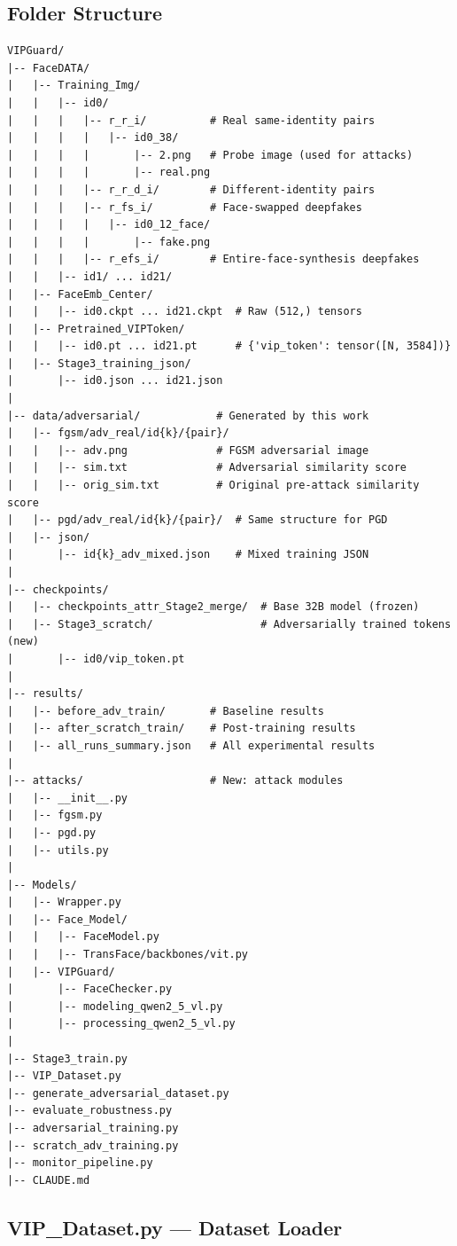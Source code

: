 \documentclass[12pt,a4paper]{article}
\begin{document}
\subsection{Folder Structure}

\begin{lstlisting}[language={},caption={Repository directory structure}]
VIPGuard/
|-- FaceDATA/
|   |-- Training_Img/
|   |   |-- id0/
|   |   |   |-- r_r_i/          # Real same-identity pairs
|   |   |   |   |-- id0_38/
|   |   |   |       |-- 2.png   # Probe image (used for attacks)
|   |   |   |       |-- real.png
|   |   |   |-- r_r_d_i/        # Different-identity pairs
|   |   |   |-- r_fs_i/         # Face-swapped deepfakes
|   |   |   |   |-- id0_12_face/
|   |   |   |       |-- fake.png
|   |   |   |-- r_efs_i/        # Entire-face-synthesis deepfakes
|   |   |-- id1/ ... id21/
|   |-- FaceEmb_Center/
|   |   |-- id0.ckpt ... id21.ckpt  # Raw (512,) tensors
|   |-- Pretrained_VIPToken/
|   |   |-- id0.pt ... id21.pt      # {'vip_token': tensor([N, 3584])}
|   |-- Stage3_training_json/
|       |-- id0.json ... id21.json
|
|-- data/adversarial/            # Generated by this work
|   |-- fgsm/adv_real/id{k}/{pair}/
|   |   |-- adv.png              # FGSM adversarial image
|   |   |-- sim.txt              # Adversarial similarity score
|   |   |-- orig_sim.txt         # Original pre-attack similarity score
|   |-- pgd/adv_real/id{k}/{pair}/  # Same structure for PGD
|   |-- json/
|       |-- id{k}_adv_mixed.json    # Mixed training JSON
|
|-- checkpoints/
|   |-- checkpoints_attr_Stage2_merge/  # Base 32B model (frozen)
|   |-- Stage3_scratch/                 # Adversarially trained tokens (new)
|       |-- id0/vip_token.pt
|
|-- results/
|   |-- before_adv_train/       # Baseline results
|   |-- after_scratch_train/    # Post-training results
|   |-- all_runs_summary.json   # All experimental results
|
|-- attacks/                    # New: attack modules
|   |-- __init__.py
|   |-- fgsm.py
|   |-- pgd.py
|   |-- utils.py
|
|-- Models/
|   |-- Wrapper.py
|   |-- Face_Model/
|   |   |-- FaceModel.py
|   |   |-- TransFace/backbones/vit.py
|   |-- VIPGuard/
|       |-- FaceChecker.py
|       |-- modeling_qwen2_5_vl.py
|       |-- processing_qwen2_5_vl.py
|
|-- Stage3_train.py
|-- VIP_Dataset.py
|-- generate_adversarial_dataset.py
|-- evaluate_robustness.py
|-- adversarial_training.py
|-- scratch_adv_training.py
|-- monitor_pipeline.py
|-- CLAUDE.md
\end{lstlisting}

\subsection{VIP\_Dataset.py --- Dataset Loader}
\end{document}
